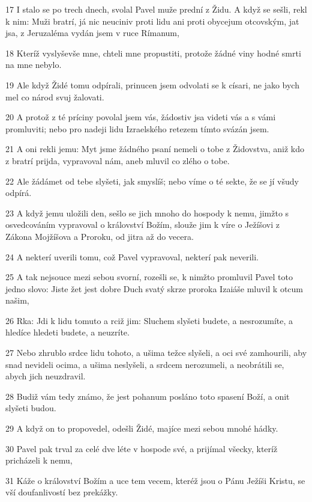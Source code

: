\par 17 I stalo se po trech dnech, svolal Pavel muže prední z Židu. A když se sešli, rekl k nim: Muži bratrí, já nic neuciniv proti lidu ani proti obycejum otcovským, jat jsa, z Jeruzaléma vydán jsem v ruce Rímanum,
\par 18 Kteríž vyslyševše mne, chteli mne propustiti, protože žádné viny hodné smrti na mne nebylo.
\par 19 Ale když Židé tomu odpírali, prinucen jsem odvolati se k císari, ne jako bych mel co národ svuj žalovati.
\par 20 A protož z té príciny povolal jsem vás, žádostiv jsa videti vás a s vámi promluviti; nebo pro nadeji lidu Izraelského retezem tímto svázán jsem.
\par 21 A oni rekli jemu: Myt jsme žádného psaní nemeli o tobe z Židovstva, aniž kdo z bratrí prijda, vypravoval nám, aneb mluvil co zlého o tobe.
\par 22 Ale žádámet od tebe slyšeti, jak smyslíš; nebo víme o té sekte, že se jí všudy odpírá.
\par 23 A když jemu uložili den, sešlo se jich mnoho do hospody k nemu, jimžto s osvedcováním vypravoval o království Božím, slouže jim k víre o Ježíšovi z Zákona Mojžíšova a Proroku, od jitra až do vecera.
\par 24 A nekterí uverili tomu, což Pavel vypravoval, nekterí pak neverili.
\par 25 A tak nejsouce mezi sebou svorní, rozešli se, k nimžto promluvil Pavel toto jedno slovo: Jiste žet jest dobre Duch svatý skrze proroka Izaiáše mluvil k otcum našim,
\par 26 Rka: Jdi k lidu tomuto a rciž jim: Sluchem slyšeti budete, a nesrozumíte, a hledíce hledeti budete, a neuzríte.
\par 27 Nebo zhrublo srdce lidu tohoto, a ušima težce slyšeli, a oci své zamhourili, aby snad nevideli ocima, a ušima neslyšeli, a srdcem nerozumeli, a neobrátili se, abych jich neuzdravil.
\par 28 Budiž vám tedy známo, že jest pohanum posláno toto spasení Boží, a onit slyšeti budou.
\par 29 A když on to propovedel, odešli Židé, majíce mezi sebou mnohé hádky.
\par 30 Pavel pak trval za celé dve léte v hospode své, a prijímal všecky, kteríž pricházeli k nemu,
\par 31 Káže o království Božím a uce tem vecem, kteréž jsou o Pánu Ježíši Kristu, se vší doufanlivostí bez prekážky.


